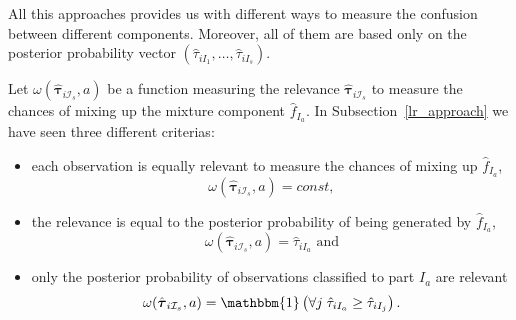 \documentclass[10pt, a4paper]{article}
\newcommand{\m}[1]{\boldsymbol{#1}}
\begin{document}
All this approaches provides us with different ways to measure the confusion between different components. Moreover, all of them are based only on the posterior probability 
vector $(\hat{\tau}_{i I_{1}}, \dots, \hat{\tau}_{i I_{s}})$. 

Let $\omega(\hat{\m \tau}_{i \mathcal{I}_s}, a)$ be a function measuring the relevance $\hat{\m \tau}_{i \mathcal{I}_s}$ to measure the chances of mixing up  the mixture component $\hat{f}_{I_a}$. In Subsection~\ref{lr_approach} we have seen three different criterias:

\begin{itemize}
\item each observation is equally relevant to measure the chances of mixing up  $\hat{f}_{I_a}$, 
\[\omega(\hat{\m \tau}_{i \mathcal{I}_s}, a) = const,\]
\item the relevance is equal to the posterior probability of being generated by  $\hat{f}_{I_a}$, 
\[\omega(\hat{\m \tau}_{i \mathcal{I}_s}, a) =  \hat{\tau}_{iI_a} \text{ and}\]
\item  only the posterior probability of observations classified to part   $I_a$ are relevant
\[\omega(\hat{\m \tau}_{i \mathcal{I}_s}, a) = \mathbbm{1}\left( \forall j\; \hat{\tau}_{i I_{a}} \geq \hat{\tau}_{iI_j} \right).\]
\end{itemize}

\end{document}
